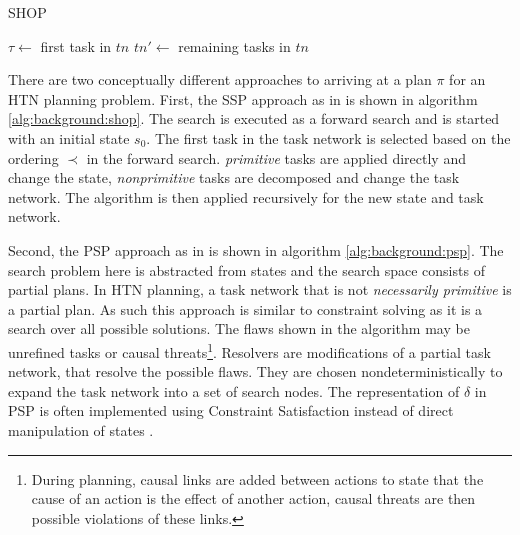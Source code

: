 \begin{algorithm}[t]
  \caption{SHOP}
  \label{alg:background:shop}
  \KwOut{$\pi$}
  $\tau \leftarrow$ first task in $tn$\;
  $tn' \leftarrow$ remaining tasks in $tn$\;
\end{algorithm}

There are two conceptually different approaches to arriving at a plan $\pi$ for an \ac{HTN} planning problem. 
First, the \ac{SSP} approach as in \cite{nauSHOPSimpleHierarchical1999} is shown in algorithm \ref{alg:background:shop}.
The search is executed as a forward search and is started with an initial state $s_0$.
The first task in the task network is selected based on the ordering $\prec$ in the forward search.
\textit{primitive} tasks are applied directly and change the state, \textit{nonprimitive} tasks are decomposed and change the task network.
The algorithm is then applied recursively for the new state and task network.

Second, the \ac{PSP} approach as in \citet[chap.~5]{ghallabAutomatedPlanningTheory2004} is shown in algorithm \ref{alg:background:psp}.
The search problem here is abstracted from states and the search space consists of partial plans.
In \ac{HTN} planning, a task network that is not \textit{necessarily primitive} is a partial plan.
As such this approach is similar to constraint solving as it is a search over all possible solutions.
The flaws shown in the algorithm may be unrefined tasks or causal threats\footnote{During planning, causal links are added between actions to state that the cause of an action is the effect of another action, causal threats are then possible violations of these links.}.
Resolvers are modifications of a partial task network, that resolve the possible flaws.
They are chosen nondeterministically to expand the task network into a set of search nodes.
The representation of $\delta$ in \ac{PSP} is often implemented using Constraint Satisfaction instead of direct manipulation of states \citep{georgievskiHTNPlanningOverview2015}.

